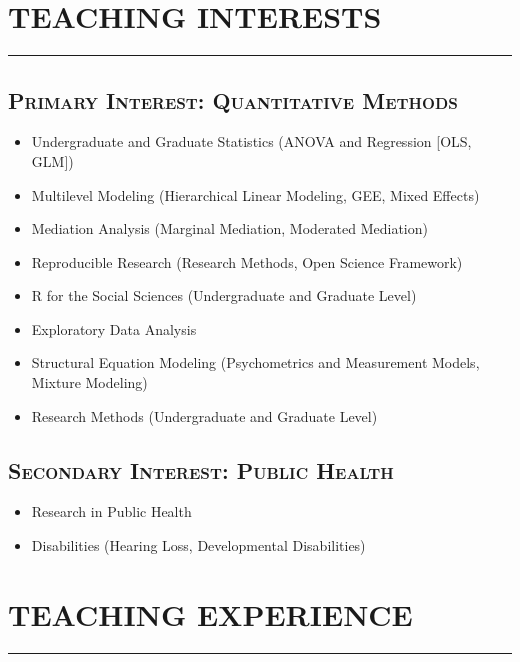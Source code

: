 \documentclass[]{DissertateUSU}
\providecommand{\tightlist}{%
  \setlength{\itemsep}{0pt}\setlength{\parskip}{0pt}}
\begin{document}
\vspace{20pt} \tocless\section{TEACHING INTERESTS} \vspace{-10pt} \hrule

\tocless\subsection{\textsc{Primary Interest: Quantitative Methods}}

\begin{itemize}
\tightlist
\item
  Undergraduate and Graduate Statistics (ANOVA and Regression {[}OLS,
  GLM{]})
\item
  Multilevel Modeling (Hierarchical Linear Modeling, GEE, Mixed Effects)
\item
  Mediation Analysis (Marginal Mediation, Moderated Mediation)
\item
  Reproducible Research (Research Methods, Open Science Framework)
\item
  R for the Social Sciences (Undergraduate and Graduate Level)
\item
  Exploratory Data Analysis
\item
  Structural Equation Modeling (Psychometrics and Measurement Models,
  Mixture Modeling)
\item
  Research Methods (Undergraduate and Graduate Level)
\end{itemize}

\tocless\subsection{\textsc{Secondary Interest: Public Health}}

\begin{itemize}
\tightlist
\item
  Research in Public Health
\item
  Disabilities (Hearing Loss, Developmental Disabilities)
\end{itemize}

\newpage

\tocless\section{TEACHING EXPERIENCE} \vspace{-10pt} \hrule
\vspace{10pt}
\end{document}
